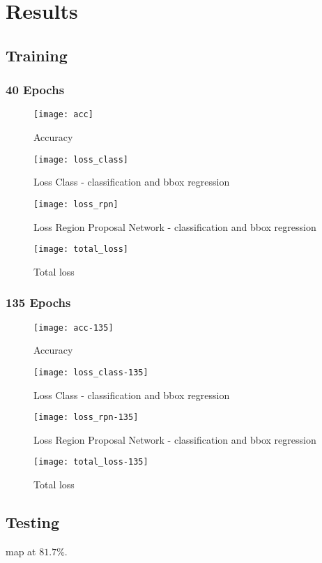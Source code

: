 \graphicspath{{figures/results/}}
\chapter{Results}
%
\section{Training}

\subsection{40 Epochs}
\begin{figure}[H]
	\centering
	\texttt{[image: acc]}
	\caption{Accuracy}
	\label{fig:}
\end{figure}
\begin{figure}[H]
	\centering
	\texttt{[image: loss\_class]}
	\caption{Loss Class - classification and bbox regression}
	\label{fig:}
\end{figure}
\begin{figure}[H]
	\centering
	\texttt{[image: loss\_rpn]}
	\caption{Loss Region Proposal Network - classification and bbox regression}
	\label{fig:}
\end{figure}
\begin{figure}[H]
	\centering
	\texttt{[image: total\_loss]}
	\caption{Total loss}
	\label{fig:}
\end{figure}

\subsection{135 Epochs}
\begin{figure}[H]
	\centering
	\texttt{[image: acc-135]}
	\caption{Accuracy}
	\label{fig:}
\end{figure}
\begin{figure}[H]
	\centering
	\texttt{[image: loss\_class-135]}
	\caption{Loss Class - classification and bbox regression}
	\label{fig:}
\end{figure}
\begin{figure}[H]
	\centering
	\texttt{[image: loss\_rpn-135]}
	\caption{Loss Region Proposal Network - classification and bbox regression}
	\label{fig:}
\end{figure}
\begin{figure}[H]
	\centering
	\texttt{[image: total\_loss-135]}
	\caption{Total loss}
	\label{fig:}
\end{figure}


\section{Testing}
\gls{map} at $81.7\%$. 

%
